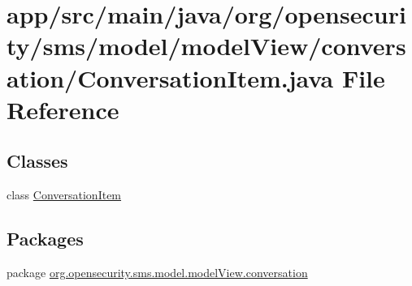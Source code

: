 \hypertarget{a00022}{\section{app/src/main/java/org/opensecurity/sms/model/model\+View/conversation/\+Conversation\+Item.java File Reference}
\label{a00022}
}
\subsection*{Classes}
\begin{DoxyCompactItemize}
\item 
class \hyperlink{a00007}{Conversation\+Item}
\end{DoxyCompactItemize}
\subsection*{Packages}
\begin{DoxyCompactItemize}
\item 
package \hyperlink{a00038}{org.\+opensecurity.\+sms.\+model.\+model\+View.\+conversation}
\end{DoxyCompactItemize}
